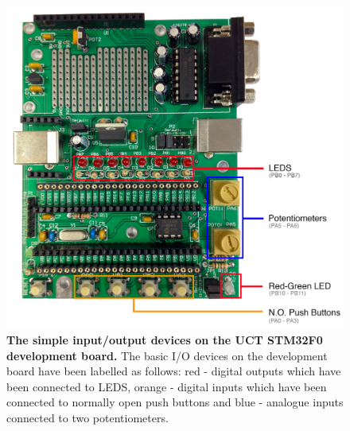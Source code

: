 \begin{figure}[ht]
  	\centering\includegraphics[scale = 0.1]{figs/STM32F0io}
	
	\caption{{\bfseries The simple input/output devices on the UCT STM32F0 development board.} The basic I/O devices on the development board have been labelled as follows: {\color{red}red} - digital outputs which have been connected to LEDS, {\color{YellowOrange} orange} - digital inputs which have been connected to normally open push buttons and {\color{blue} blue} - analogue inputs connected to two potentiometers.}
	\label {fig:STM32F0io}
\end{figure}
\pagebreak
